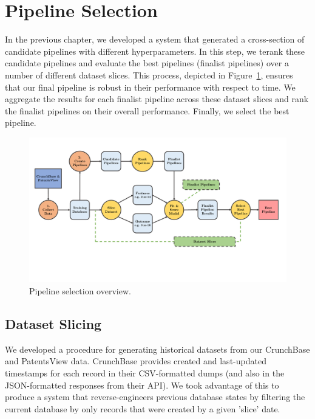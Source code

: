 \documentclass[../thesis/thesis.tex]{subfiles}
\begin{document}
\section{Pipeline Selection}

In the previous chapter, we developed a system that generated a cross-section of candidate pipelines with different hyperparameters. In this step, we terank these candidate pipelines and evaluate the best pipelines (finalist pipelines) over a number of different dataset slices. This process, depicted in Figure~\ref{fig:design:pipeline_selection}, ensures that our final pipeline is robust in their performance with respect to time. We aggregate the results for each finalist pipeline across these dataset slices and rank the finalist pipelines on their overall performance. Finally, we select the best pipeline.

\begin{figure}[!htb]
    \centering
    \includegraphics[width=\textwidth]{../figures/design/flowchart_pipeline_selection}
    \caption[Pipeline selection flowchart]{Pipeline selection overview.}
    \label{fig:design:pipeline_selection}
\end{figure}

\subsection{Dataset Slicing}

We developed a procedure for generating historical datasets from our CrunchBase and PatentsView data. CrunchBase provides created and last-updated timestamps for each record in their CSV-formatted dumps (and also in the JSON-formatted responses from their API). We took advantage of this to produce a system that reverse-engineers previous database states by filtering the current database by only records that were created by a given 'slice' date.
\end{document}
